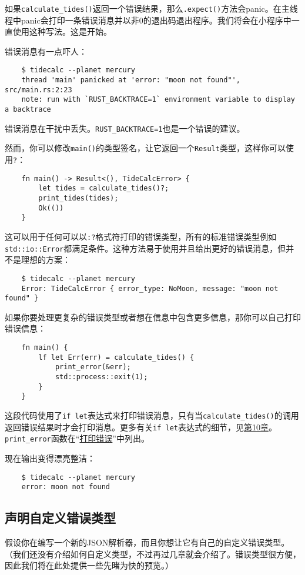 如果\texttt{calculate\_tides()}返回一个错误结果，那么\texttt{.expect()}方法会panic。在主线程中panic会打印一条错误消息并以非0的退出码退出程序。我们将会在小程序中一直使用这种写法。这是开始。

错误消息有一点吓人：
\begin{verbatim}
    $ tidecalc --planet mercury
    thread 'main' panicked at 'error: "moon not found"', src/main.rs:2:23
    note: run with `RUST_BACKTRACE=1` environment variable to display a backtrace
\end{verbatim}
错误消息在干扰中丢失。\texttt{RUST\_BACKTRACE=1}也是一个错误的建议。

然而，你可以修改\texttt{main()}的类型签名，让它返回一个\texttt{Result}类型，这样你可以使用\texttt{?}：
\begin{verbatim}
    fn main() -> Result<(), TideCalcError> {
        let tides = calculate_tides()?;
        print_tides(tides);
        Ok(())
    }
\end{verbatim}

这可以用于任何可以以\texttt{{:?}}格式符打印的错误类型，所有的标准错误类型例如\texttt{std::io::Error}都满足条件。这种方法易于使用并且给出更好的错误消息，但并不是理想的方案：
\begin{verbatim}
    $ tidecalc --planet mercury
    Error: TideCalcError { error_type: NoMoon, message: "moon not found" }
\end{verbatim}

如果你要处理更复杂的错误类型或者想在信息中包含更多信息，那你可以自己打印错误信息：
\begin{verbatim}
    fn main() {
        lf let Err(err) = calculate_tides() {
            print_error(&err);
            std::process::exit(1);
        }
    }
\end{verbatim}

这段代码使用了\texttt{if let}表达式来打印错误消息，只有当\texttt{calculate\_tides()}的调用返回错误结果时才会打印消息。更多有关\texttt{if let}表达式的细节，见\hyperref[ch10]{第10章}。\texttt{print\_error}函数在“\hyperref[printerror]{打印错误}”中列出。

现在输出变得漂亮整洁：
\begin{verbatim}
    $ tidecalc --planet mercury
    error: moon not found
\end{verbatim}

\subsection{声明自定义错误类型}
假设你在编写一个新的JSON解析器，而且你想让它有自己的自定义错误类型。（我们还没有介绍如何自定义类型，不过再过几章就会介绍了。错误类型很方便，因此我们将在此处提供一些先睹为快的预览。）

